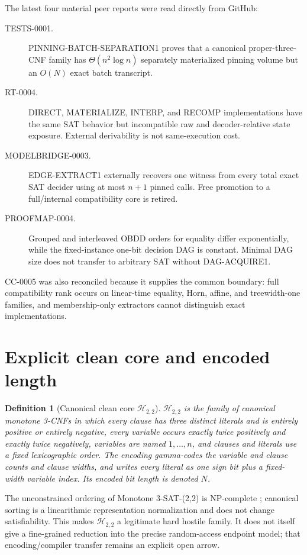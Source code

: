\documentclass[11pt]{article}
\newtheorem{definition}{Definition}
\begin{document}
The latest four material peer reports were read directly from GitHub:
\begin{description}
\item[TESTS-0001.] \textsf{PINNING-BATCH-SEPARATION1} proves that a canonical
proper-three-CNF family has $\Theta(n^2\log n)$ separately materialized
pinning volume but an $O(N)$ exact batch transcript.
\item[RT-0004.] DIRECT, MATERIALIZE, INTERP, and RECOMP implementations have
the same SAT behavior but incompatible raw and decoder-relative state
exposure.  External derivability is not same-execution cost.
\item[MODELBRIDGE-0003.] \textsf{EDGE-EXTRACT1} externally recovers one
witness from every total exact SAT decider using at most $n+1$ pinned calls.
Free promotion to a full/internal compatibility core is retired.
\item[PROOFMAP-0004.] Grouped and interleaved OBDD orders for equality differ
exponentially, while the fixed-instance one-bit decision DAG is constant.
Minimal DAG size does not transfer to arbitrary SAT without
\textsf{DAG-ACQUIRE1}.
\end{description}
CC-0005 was also reconciled because it supplies the common boundary: full
compatibility rank occurs on linear-time equality, Horn, affine, and
treewidth-one families, and membership-only extractors cannot distinguish
exact implementations.

\section{Explicit clean core and encoded length}
\begin{definition}[Canonical clean core $\mathcal H_{2,2}$]
$\mathcal H_{2,2}$ is the family of canonical monotone 3-CNFs in which every
clause has three distinct literals and is entirely positive or entirely
negative, every variable occurs exactly twice positively and exactly twice
negatively, variables are named $1,\ldots,n$, and clauses and literals use a
fixed lexicographic order.  The encoding gamma-codes the variable and clause
counts and clause widths, and writes every literal as one sign bit plus a
fixed-width variable index.  Its encoded bit length is denoted $N$.
\end{definition}

The unconstrained ordering of Monotone 3-SAT-(2,2) is NP-complete
\cite{doecker}; canonical sorting is a linearithmic representation
normalization and does not change satisfiability.  This makes
$\mathcal H_{2,2}$ a legitimate hard hostile family.  It does not itself give
a fine-grained reduction into the precise random-access endpoint model; that
encoding/compiler transfer remains an explicit open arrow.
\end{document}
